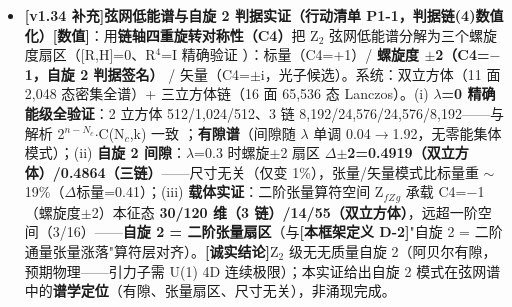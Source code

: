 \documentclass[UTF8,fontset=windows]{csoarticle}
\newcommand{\mtag}[1]{\textbf{[#1]}}
\newcommand{\up}[1]{\ensuremath{^{#1}}}
\newcommand{\down}[1]{\ensuremath{_{#1}}}
\begin{document}
\begin{itemize}
\item \textbf{\mtag{v1.34 补充}弦网低能谱与自旋 2 判据实证（行动清单 P1-1，判据链(4)数值化）}\mtag{数值}：用\textbf{链轴四重旋转对称性（C4）}把 Z\down{2} 弦网低能谱分解为三个螺旋度扇区（[R,H]=0、R\up{4}=I 精确验证 \checkmark）：标量（C4=+1）/ \textbf{螺旋度 \ensuremath{\pm}2（C4=\ensuremath{-}1，自旋 2 判据签名）} / 矢量（C4=\ensuremath{\pm}i，光子候选）。系统：双立方体（11 面 2,048 态密集全谱）+ 三立方体链（16 面 65,536 态 Lanczos）。(i) \textbf{\ensuremath{\lambda}=0 精确能级全验证}：2 立方体 512/1,024/512、3 链 8,192/24,576/24,576/8,192------与解析 2\up{n-N\down{c}}\ensuremath{\cdot}C(N\down{c},k) 一致 \checkmark；\textbf{有隙谱}（间隙随 \ensuremath{\lambda} 单调 0.04\ensuremath{\to}1.92，无零能集体模式）；(ii) \textbf{自旋 2 间隙}：\ensuremath{\lambda}=0.3 时螺旋\ensuremath{\pm}2 扇区 \textbf{\ensuremath{\Delta}\ensuremath{\pm}2=0.4919（双立方体）/0.4864（三链）}------尺寸无关（仅变 1\%），张量/矢量模式比标量重 \ensuremath{\sim}19\%（\ensuremath{\Delta}标量=0.41）；(iii) \textbf{载体实证}：二阶张量算符空间 Z\down{fZ}\down{g} 承载 C4=\ensuremath{-}1（螺旋度\ensuremath{\pm}2）本征态 \textbf{30/120 维（3 链）/14/55（双立方体）}，远超一阶空间（3/16）------\textbf{自旋 2 = 二阶张量扇区}（与\mtag{本框架定义 D-2}"自旋 2 = 二阶通量张量涨落"算符层对齐）。\mtag{诚实结论}Z\down{2} 级无无质量自旋 2（阿贝尔有隙，预期物理------引力子需 U(1) 4D 连续极限）；本实证给出自旋 2 模式在弦网谱中的\textbf{谱学定位}（有隙、张量扇区、尺寸无关），非涌现完成。
\end{itemize}
\end{document}
